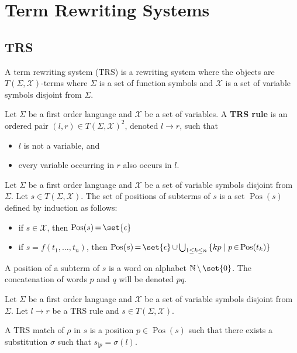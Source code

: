 \section{Term Rewriting Systems}

\subsection{TRS}
A term rewriting system (TRS) is a rewriting system where the objects are $T(\Sigma,\mathcal{X})$-terms where $\Sigma$ is a set of function symbols and $\mathcal{X}$ is a set of variable symbols disjoint from $\Sigma$.
  
\begin{definition}
    Let $\Sigma$ be a first order language and $\mathcal{X}$ be a set of variables. A \textbf{TRS rule} is an ordered pair $(l,r) \mathop{\in} T(\Sigma, \mathcal{X})^2$, denoted $l \mathop{\to} r$, such that
    \begin{itemize}
      \item $l$ is not a variable, and
      \item every variable occurring in $r$ also occurs in $l$.
    \end{itemize}
  \end{definition}
  
  \begin{definition}
    Let $\Sigma$ be a first order language and $\mathcal{X}$ be a set of variable symbols disjoint from $\Sigma$. Let $s \mathop{\in} T(\Sigma, \mathcal{X})$.
    The set of positions of subterms of $s$ is a set $\operatorname{Pos}(s)$ defined by induction as follows:
    \begin{itemize}
      \item if $s \mathop{\in} \mathcal{X}$, then $\operatorname{Pos}(s) \mathop{=} \set{\epsilon}$
      \item if $s \mathop{=} f(t_1,\hdots,t_n)$, 
            then $\operatorname{Pos}(s) \mathop{=} \set{\epsilon} \mathop{\cup} \bigcup_{1 \leq k \leq n} \left \{kp\mid p \mathop{\in} \operatorname{Pos}(t_k) \right \}$
  \end{itemize}
  A position of a subterm of $s$ is a word on alphabet $\mathbb{N}\mathop{\setminus}\set{0}$. 
    The concatenation of words $p$ and $q$ will be denoted $pq$.
  \end{definition}
  
  \begin{definition}[Match]
    \label{def:trs:match}
    Let $\Sigma$ be a first order language and $\mathcal{X}$ be a set of variable symbols disjoint from $\Sigma$. Let $ l \mathop{\to} r $ be a TRS rule and $s \mathop{\in} T(\Sigma, \mathcal{X})$.

    A TRS match of $\rho$ in $s$ is a position $p \mathop{\in} \operatorname{Pos}(s)$ such that there exists a substitution $\sigma$ such that $s_{|p} \mathop{=} \sigma(l)$.
  \end{definition}

